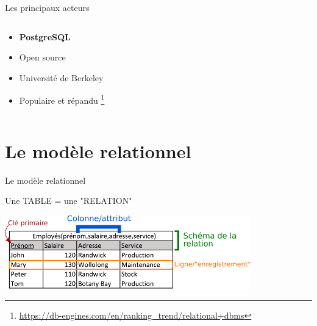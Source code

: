 \documentclass[xetex,dvipsnames]{beamer}
\begin{document}
\begin{frame}{Les principaux acteurs}
\begin{columns}
\begin{column}{0.5\textwidth}
\begin{center}
	    \end{center}
		\begin{itemize}
			\item \textbf{PostgreSQL}
			\item Open source
			\item Université de Berkeley
			\item Populaire et répandu \footnote{{\tiny \url{https://db-engines.com/en/ranking_trend/relational+dbms}}}
		\end{itemize} 
	    \end{column}

    \end{columns}
\end{frame}



\section{Le modèle relationnel}
\begin{frame}[t]{Le modèle relationnel}
		\begin{center}
			Une TABLE = une "RELATION"
	    \end{center}
			\vspace{0.3em}
	    	\includegraphics[width=0.8\textwidth]{./figures/relation.pdf}
	    	\vspace{0.3em}

\end{frame}
\end{document}
